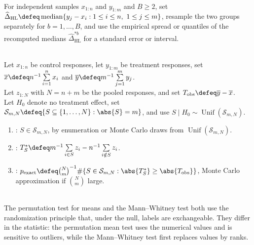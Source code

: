 \begin{method} \label{meth:bootstrap-hodges-lehmann-shift} \\
For independent samples $x_{1:n}$ and $y_{1:m}$ and $B\geq2$, set $\widehat{\Delta}_{\mathrm{HL}}\defeq\operatorname{median}\{y_j-x_i:1\leq i\leq n,\ 1\leq j\leq m\}$, resample the two groups separately for $b=1,\ldots,B$, and use the empirical spread or quantiles of the recomputed medians $\widehat{\Delta}_{\mathrm{HL}}^{\ast b}$ for a standard error or interval.
\end{method}

\begin{method} \label{meth:two-sample-permutation-mean-test} \\
Let $x_{1:n}$ be control responses, let $y_{1:m}$ be treatment responses, set $\overline{x}\defeq n^{-1}\sum\limits_{i=1}^{n}x_i$ and $\overline{y}\defeq m^{-1}\sum\limits_{j=1}^{m}y_j$.\\
Let $z_{1:N}$ with $N=n+m$ be the pooled responses, and set $T_{\mathrm{obs}}\defeq \overline{y}-\overline{x}$.\\
Let $H_0$ denote no treatment effect, set $\mathcal{S}_{m,N}\defeq\{S\subseteq\{1,\ldots,N\}:\abs{S}=m\}$, and use $S\mid H_0\sim\operatorname{Unif}(\mathcal{S}_{m,N})$.
\begin{enumerate}[label=(\roman*)]
\setlength{\itemsep}{0pt}
\item {}: $S\in\mathcal{S}_{m,N}$, by enumeration or Monte Carlo draws from $\operatorname{Unif}(\mathcal{S}_{m,N})$.
\item {}: $T_S^\ast\defeq m^{-1}\sum\limits_{i\in S}z_i-n^{-1}\sum\limits_{i\notin S}z_i$.
\item {}: $p_{\mathrm{exact}}\defeq\binom{N}{m}^{-1}\#\{S\in\mathcal{S}_{m,N}:\abs{T_S^\ast}\geq\abs{T_{\mathrm{obs}}}\}$, Monte Carlo approximation if $\binom{N}{m}$ large.
\end{enumerate}
\end{method}

\begin{remark} \label{rem:permutation-versus-rank-tests} \\
The permutation test for means and the Mann--Whitney test both use the randomization principle that, under the null, labels are exchangeable.  They differ in the statistic: the permutation mean test uses the numerical values and is sensitive to outliers, while the Mann--Whitney test first replaces values by ranks.
\end{remark}
